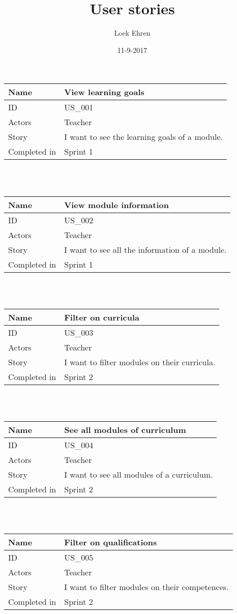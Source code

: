 \documentclass[12pt, a4paper]{article}
\author{Loek Ehren}
\title{\textbf{User stories}}
\date{11-9-2017}
\newcommand\addrow[2]{#1 &#2\\ }
\newcommand\tabularhead{\begin{tabular}{lp{8cm}}
		\hline
	}
\newenvironment{usecase}{\tabularhead}
	{\hline\end{tabular}}
\begin{document}
    \maketitle

    \begin{usecase}
    	\addrow{Name}{View learning goals}
    	\hline
    	\addrow{ID}{US\_001}
    	\hline
    	\addrow{Actors}{ Teacher }
    	\hline		
    	\addrow{Story}{I want to see the learning goals of a module.}
    	\hline
    	\addrow{Completed in}{Sprint 1}
    \end{usecase}
    
    ~\\
    ~\\
    
    \begin{usecase}
    	\addrow{Name}{View module information}
    	\hline
    	\addrow{ID}{US\_002}
    	\hline
    	\addrow{Actors}{ Teacher }
    	\hline		
    	\addrow{Story}{I want to see all the information of a module.}
    	    	\hline
    	\addrow{Completed in}{Sprint 1}
    \end{usecase}
    
    ~\\
    ~\\
    
    \begin{usecase}
	\addrow{Name}{Filter on curricula}
	\hline
	\addrow{ID}{US\_003}
	\hline
	\addrow{Actors}{ Teacher }
	\hline		
	\addrow{Story}{I want to filter modules on their curricula.}
	\hline
	\addrow{Completed in}{Sprint 2}
	\end{usecase}

	~\\
	~\\
	
	    \begin{usecase}
		\addrow{Name}{See all modules of curriculum}
		\hline
		\addrow{ID}{US\_004}
		\hline
		\addrow{Actors}{ Teacher }
		\hline		
		\addrow{Story}{I want to see all modules of a curriculum.}
		\hline
		\addrow{Completed in}{Sprint 2}
	\end{usecase}
	
	~\\
~\\

\begin{usecase}
	\addrow{Name}{Filter on qualifications}
	\hline
	\addrow{ID}{US\_005}
	\hline
	\addrow{Actors}{ Teacher }
	\hline		
	\addrow{Story}{I want to filter modules on their competences.}
	\hline
	\addrow{Completed in}{Sprint 2}
\end{usecase}
\end{document}
